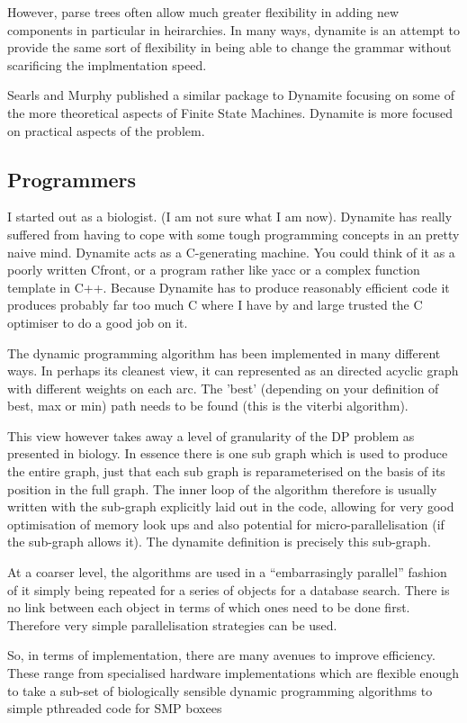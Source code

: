 However, parse trees often allow much greater flexibility in adding new
components in particular in heirarchies. In many ways, dynamite is an
attempt to provide the same sort of flexibility in being able to change
the grammar without scarificing the implmentation speed.

Searls and Murphy published a similar package to Dynamite
focusing on some of the more theoretical aspects of Finite State Machines.
Dynamite is more focused on practical aspects of the problem. 


\subsection{Programmers}
I started out as a biologist. (I am not sure what I am now). Dynamite
has really suffered from having to cope with some tough programming
concepts in an pretty naive mind. Dynamite acts as a C-generating
machine. You could think of it as a poorly written Cfront, or a
program rather like yacc or a complex function template in
C++. Because Dynamite has to produce reasonably efficient code it
produces probably far too much C where I have by and large trusted the
C optimiser to do a good job on it.  


The dynamic programming algorithm has been implemented in many different ways.
In perhaps its cleanest view, it can represented as an directed acyclic graph
with different weights on each arc. The 'best' (depending on your definition
of best, max or min) path needs to be found (this is the viterbi algorithm).

This view however takes away a level of granularity of the DP problem as 
presented in biology. In essence there is one sub graph which is used to 
produce the entire graph, just that each sub graph is reparameterised on the
basis of its position in the full graph. The inner loop of the algorithm
therefore is usually written with the sub-graph explicitly laid out in 
the code, allowing for very good optimisation of memory look ups and also
potential for micro-parallelisation (if the sub-graph allows it). The 
dynamite definition is precisely this sub-graph.

At a coarser level, the algorithms are used in a ``embarrasingly
parallel'' fashion of it simply being repeated for a series of objects
for a database search. There is no link between each object in terms
of which ones need to be done first.  Therefore very simple
parallelisation strategies can be used.

So, in terms of implementation, there are many avenues to improve 
efficiency. These range from specialised hardware implementations which
are flexible enough to take a sub-set of biologically sensible dynamic
programming algorithms to simple pthreaded code for SMP boxees


